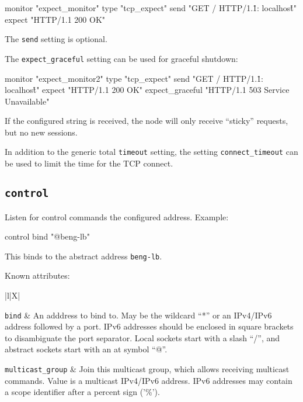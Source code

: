 \documentclass[a4paper,12pt]{article}
\begin{document}
\begin{verbatim*}
monitor "expect_monitor" {
  type "tcp_expect"
  send "GET / HTTP/1.1\r\nHost: localhost\r\n\r\n"
  expect "HTTP/1.1 200 OK"
}
\end{verbatim*}

The \texttt{send} setting is optional.

The \verb|expect_graceful| setting can be used for graceful shutdown:

\begin{verbatim*}
monitor "expect_monitor2" {
  type "tcp_expect"
  send "GET / HTTP/1.1\r\nHost: localhost\r\n\r\n"
  expect "HTTP/1.1 200 OK"
  expect_graceful "HTTP/1.1 503 Service Unavailable"
}
\end{verbatim*}

If the configured string is received, the node will only receive
``sticky'' requests, but no new sessions.

In addition to the generic total \verb|timeout| setting, the setting
\verb|connect_timeout| can be used to limit the time for the TCP
connect.


\subsection{\texttt{control}}
\label{config.control}

Listen for control commands the configured address.  Example:

\begin{verbatim*}
control {
  bind "@beng-lb"
}
\end{verbatim*}

This binds to the abstract address \verb|beng-lb|.

Known attributes:

\begin{longtabu*}{|l|X|}\hline

\verb|bind| & An adddress to bind to.  May be the wildcard ``*'' or an
IPv4/IPv6 address followed by a port.  IPv6 addresses should be
enclosed in square brackets to disambiguate the port separator.  Local
sockets start with a slash ``/'', and abstract sockets start with an
at symbol ``@''. \\\hline

\verb|multicast_group| & Join this multicast group, which allows
receiving multicast commands.  Value is a multicast IPv4/IPv6
address.  IPv6 addresses may contain a scope identifier after a
percent sign ('\%'). \\\hline

\end{longtabu*}
\end{document}
